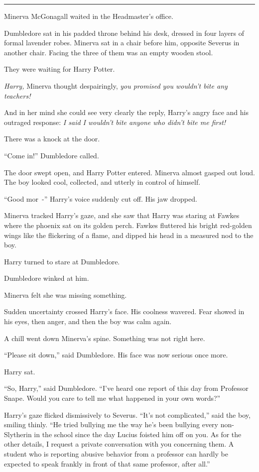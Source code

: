 \begin{center}\rule{3in}{0.4pt}\end{center}

Minerva McGonagall waited in the Headmaster's office.

Dumbledore sat in his padded throne behind his desk, dressed in four layers of formal lavender robes. Minerva sat in a chair before him, opposite Severus in another chair. Facing the three of them was an empty wooden stool.

They were waiting for Harry Potter.

\emph{Harry,} Minerva thought despairingly, \emph{you promised you wouldn't bite any teachers!}

And in her mind she could see very clearly the reply, Harry's angry face and his outraged response: \emph{I said I wouldn't bite anyone who didn't bite me first!}

There was a knock at the door.

``Come in!'' Dumbledore called.

The door swept open, and Harry Potter entered. Minerva almost gasped out loud. The boy looked cool, collected, and utterly in control of himself.

``Good mor~-'' Harry's voice suddenly cut off. His jaw dropped.

Minerva tracked Harry's gaze, and she saw that Harry was staring at Fawkes where the phoenix sat on its golden perch. Fawkes fluttered his bright red-golden wings like the flickering of a flame, and dipped his head in a measured nod to the boy.

Harry turned to stare at Dumbledore.

Dumbledore winked at him.

Minerva felt she was missing something.

Sudden uncertainty crossed Harry's face. His coolness wavered. Fear showed in his eyes, then anger, and then the boy was calm again.

A chill went down Minerva's spine. Something was not right here.

``Please sit down,'' said Dumbledore. His face was now serious once more.

Harry sat.

``So, Harry,'' said Dumbledore. ``I've heard one report of this day from Professor Snape. Would you care to tell me what happened in your own words?''

Harry's gaze flicked dismissively to Severus. ``It's not complicated,'' said the boy, smiling thinly. ``He tried bullying me the way he's been bullying every non-Slytherin in the school since the day Lucius foisted him off on you. As for the other details, I request a private conversation with you concerning them. A student who is reporting abusive behavior from a professor can hardly be expected to speak frankly in front of that same professor, after all.''

